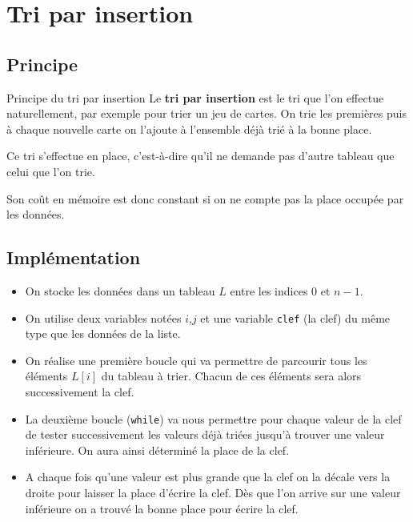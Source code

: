\section{Tri par insertion}
\subsection{Principe}

\begin{defi}{Principe du tri par insertion}
Le \textbf{tri par insertion} est le tri que l'on effectue naturellement, par exemple pour trier un jeu de cartes. On trie les premières puis à chaque nouvelle carte on l'ajoute à l'ensemble déjà trié à la bonne place. 

Ce tri s'effectue en place, c'est-à-dire qu'il ne demande pas d'autre tableau que celui que l'on trie. 

Son coût en mémoire est donc constant si on ne compte pas la place occupée par les données.
\end{defi}



\subsection{Implémentation}


\begin{itemize}
\item On stocke les données dans un tableau $L$ entre les indices $0$ et $n-1$.
\item On utilise deux variables notées $i$,$j$ et une variable \texttt{clef} (la clef) du même type que les données de la liste.
\item On réalise une première boucle qui va permettre de parcourir tous les éléments $L[i]$ du tableau à trier.
Chacun de ces éléments sera alors successivement la clef.
\item La deuxième boucle (\texttt{while}) va nous permettre pour chaque valeur de la clef de tester successivement les valeurs déjà triées jusqu'à trouver une valeur inférieure. On aura ainsi déterminé la place de la clef.
\item A chaque fois qu'une valeur est plus grande que la clef on la décale vers la droite pour laisser la place d'écrire la clef.
Dès que l'on arrive sur une valeur inférieure on a trouvé la bonne place pour écrire la clef.
\end{itemize}





